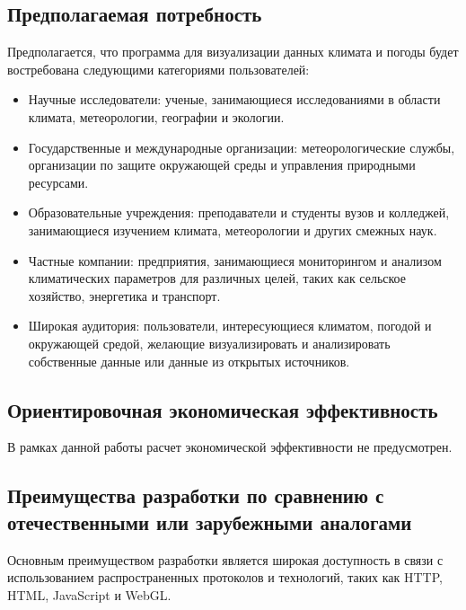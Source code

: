 \documentclass[a4paper, 12pt]{article}
\begin{document}
	\subsection{Предполагаемая потребность}
	Предполагается, что программа для визуализации данных климата и погоды будет востребована следующими категориями пользователей:
	\begin{itemize}
		\item Научные исследователи: ученые, занимающиеся исследованиями в области климата, метеорологии, географии и экологии.

		\item Государственные и международные организации: метеорологические службы, организации по защите окружающей среды и
			управления природными ресурсами.

		\item Образовательные учреждения: преподаватели и студенты вузов и колледжей, занимающиеся изучением климата,
			метеорологии и других смежных наук.

		\item Частные компании: предприятия, занимающиеся мониторингом и анализом климатических параметров для различных целей,
			таких как сельское хозяйство, энергетика и транспорт.

		\item Широкая аудитория: пользователи, интересующиеся климатом, погодой и окружающей средой, желающие визуализировать
			и анализировать собственные данные или данные из открытых источников.
	\end{itemize}

	\subsection{Ориентировочная экономическая эффективность}
	В рамках данной работы расчет экономической эффективности не предусмотрен.

	\subsection{Преимущества разработки по сравнению с отечественными или зарубежными аналогами}
	Основным преимуществом разработки является широкая доступность в связи с использованием распространенных протоколов и технологий,
	таких как HTTP, HTML, JavaScript и WebGL.
\end{document}
